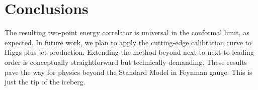 \section{Conclusions}\label{sec:conclusions}

The resulting two-point energy correlator is universal in the conformal
limit, as expected. In future work, we plan to apply the cutting-edge
calibration curve to Higgs plus jet production. Extending the method
beyond next-to-next-to-leading order is conceptually straightforward but
technically demanding. These results pave the way for physics beyond the
Standard Model in Feynman gauge. This is just the tip of the iceberg.


